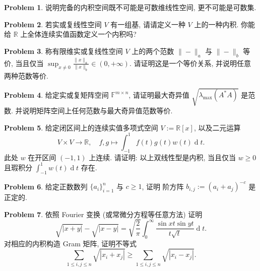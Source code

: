 \documentclass{MainStyle}
\theoremstyle{definition}
\newtheorem{problem}{Problem}
\begin{document}
\begin{problem}
说明完备的内积空间既不可能是可数维线性空间, 更不可能是可数集.
\end{problem}

\begin{problem}
若实或复线性空间 $V$ 有一组基, 请请定义一种 $V$ 上的一种内积. 你能给 $\mathbb R$ 上全体连续实值函数定义一个内积吗?
\end{problem}

\begin{problem}
称有限维实或复线性空间 $V$ 上的两个范数 $\|-\|_{a}$ 与 $\|-\|_{b}$ 等价, 当且仅当 $\sup_{x\neq 0}\frac{\|x\|_a}{\|x\|_b}\in (0,+\infty)$. 请证明这是一个等价关系, 并说明任意两种范数等价.
\end{problem}

\begin{problem}
给定实或复矩阵空间 $\mathbb F^{m\times n}$, 请证明最大奇异值 $\sqrt{\lambda_{\max}(A^\ast A)}$ 是范数. 并说明矩阵空间上任何范数与最大奇异值范数等价.
\end{problem}

\begin{problem}
给定闭区间上的连续实值多项式空间 $V:=\mathbb R[x]$, 以及二元运算
\begin{equation}
    V\times V\to \mathbb R,\quad  f,g\mapsto \int_{-1}^1 f(t)g(t)w(t)\operatorname dt.
\end{equation}
此处 $w$ 在开区间 $(-1,1)$ 上连续. 请证明: 以上双线性型是内积, 当且仅当 $w\geq 0$ 且瑕积分 $\int_{-1}^1w(t)\operatorname dt$ 存在.
\end{problem}

\begin{problem}
给定正数数列 $\{a_i\}_{i=1}^n$ 与 $c\geq 1$, 证明
阶方阵 $b_{i,j}:=(a_i+a_j)^{-c}$ 是正定的.
\end{problem}

\begin{problem}
依照 Fourier 变换 (或常微分方程等任意方法) 证明
\begin{equation}
    \sqrt{|x+y|}-\sqrt{|x-y|}=\sqrt{\frac{2}{\pi}}\int_0^\infty\frac{\sin xt\sin yt}{t\sqrt t}\operatorname dt.
\end{equation}
对相应的内积构造 Gram 矩阵, 证明不等式
\begin{equation}
    \sum_{1\leq i,j\leq n}\sqrt{|x_i+x_j|}\geq \sum_{1\leq i,j\leq n}\sqrt{|x_i-x_j|}.
\end{equation}
\end{problem}
\end{document}
